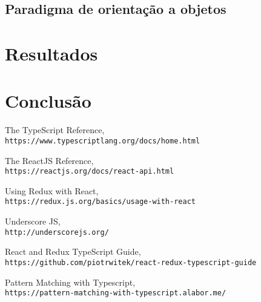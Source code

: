 \documentclass[rel_mlp]{iiufrgs}
\begin{document}
\section{Paradigma de orientação a objetos}

\chapter{Resultados}

\chapter{Conclusão}



\begin{thebibliography}{9}
The TypeScript Reference,
\\\texttt{https://www.typescriptlang.org/docs/home.html}

The ReactJS Reference,
\\\texttt{https://reactjs.org/docs/react-api.html}


Using Redux with React,
\\\texttt{https://redux.js.org/basics/usage-with-react}

Underscore JS,
\\\texttt{http://underscorejs.org/}

React and Redux TypeScript Guide,
\\\texttt{https://github.com/piotrwitek/react-redux-typescript-guide}

Pattern Matching with Typescript,
\\\texttt{https://pattern-matching-with-typescript.alabor.me/}

\end{thebibliography}
\end{document}
